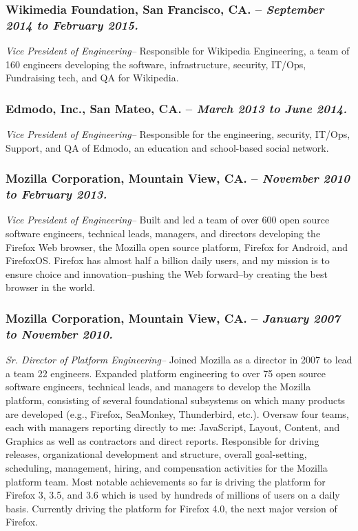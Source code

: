 \documentclass[10pt]{report}
\begin{document}
\subsubsection*{Wikimedia Foundation, San Francisco, CA. -- \emph{September 2014
to February 2015. }} \emph{Vice President of Engineering--} Responsible for
Wikipedia Engineering, a team of 160 engineers developing the software,
infrastructure, security, IT/Ops, Fundraising tech, and QA for Wikipedia.

\subsubsection*{Edmodo, Inc., San Mateo, CA. -- \emph{March 2013 to June 2014.
}} \emph{Vice President of Engineering--} Responsible for the engineering,
security, IT/Ops, Support, and QA of Edmodo, an education and school-based
social network.

\subsubsection*{Mozilla Corporation, Mountain View, CA. -- \emph{November 2010
to February 2013. }} \emph{Vice President of Engineering--} Built and led a team
of over 600 open source software engineers, technical leads, managers, and
directors developing the Firefox Web browser, the Mozilla open source platform,
Firefox for Android, and FirefoxOS.  Firefox has almost half a billion daily
users, and my mission is to ensure choice and innovation--pushing the Web
forward--by creating the best browser in the world.

\subsubsection*{Mozilla Corporation, Mountain View, CA. -- \emph{January 2007 to
November 2010. }} \emph{Sr. Director of Platform Engineering--} Joined Mozilla
as a director in 2007 to lead a team 22 engineers.  Expanded platform
engineering to over 75 open source software engineers, technical leads, and
managers to develop the Mozilla platform, consisting of several foundational
subsystems on which many products are developed (e.g., Firefox, SeaMonkey,
Thunderbird, etc.).  Oversaw four teams, each with managers reporting directly
to me:  JavaScript, Layout, Content, and Graphics as well as contractors and
direct reports.  Responsible for driving releases, organizational development
and structure, overall goal-setting, scheduling, management, hiring, and
compensation activities for the Mozilla platform team.  Most notable
achievements so far is driving the platform for Firefox 3, 3.5, and 3.6 which is
used by hundreds of millions of users on a daily basis.  Currently driving the
platform for Firefox 4.0, the next major version of Firefox.
\end{document}
